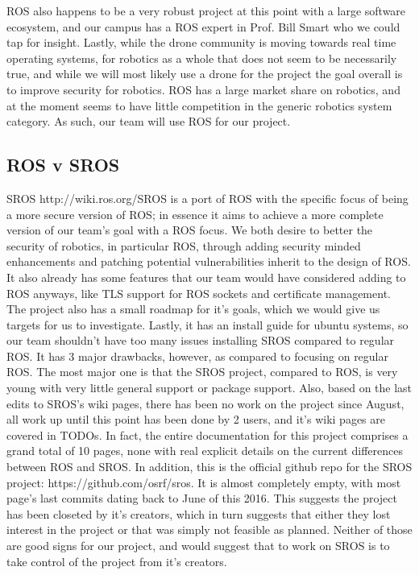 \documentclass[IEEEtran,letterpaper,10pt,titlepage,draftclsnofoot,onecolumn]{article}
\begin{document}
ROS also happens to be a very robust project at this point with a large software ecosystem, and our campus has a ROS expert in Prof. Bill Smart who we could tap for insight. 
Lastly, while the drone community is moving towards real time operating systems, for robotics as a whole that does not seem to be necessarily true, and while we will most likely use a drone for the project the goal overall is to improve security for robotics. 
ROS has a large market share on robotics, and at the moment seems to have little competition in the generic robotics system category. As such, our team will use ROS for our project.

\subsection*{ROS v SROS}
SROS http://wiki.ros.org/SROS is a port of ROS with the specific focus of being a more secure version of ROS; in essence it aims to achieve a more complete version of our team's goal with a ROS focus. 
We both desire to better the security of robotics, in particular ROS, through adding security minded enhancements and patching potential vulnerabilities inherit to the design of ROS. 
It also already has some features that our team would have considered adding to ROS anyways, like TLS support for ROS sockets and certificate management. 
The project also has a small roadmap for it's goals, which we would give us targets for us to investigate. 
Lastly, it has an install guide for ubuntu systems, so our team shouldn't have too many issues installing SROS compared to regular ROS. 
It has 3 major drawbacks, however, as compared to focusing on regular ROS. 
The most major one is that the SROS project, compared to ROS, is very young with very little general support or package support. 
Also, based on the last edits to SROS's wiki pages, there has been no work on the project since August, all work up until this point has been done by 2 users, and it's wiki pages are covered in TODOs. 
In fact, the entire documentation for this project comprises a grand total of 10 pages, none with real explicit details on the current differences between ROS and SROS. 
In addition, this is the official github repo for the SROS project: https://github.com/osrf/sros. 
It is almost completely empty, with most page's last commits dating back to June of this 2016. 
This suggests the project has been closeted by it's creators, which in turn suggests that either they lost interest in the project or that was simply not feasible as planned. 
Neither of those are good signs for our project, and would suggest that to work on SROS is to take control of the project from it's creators. 
\end{document}
